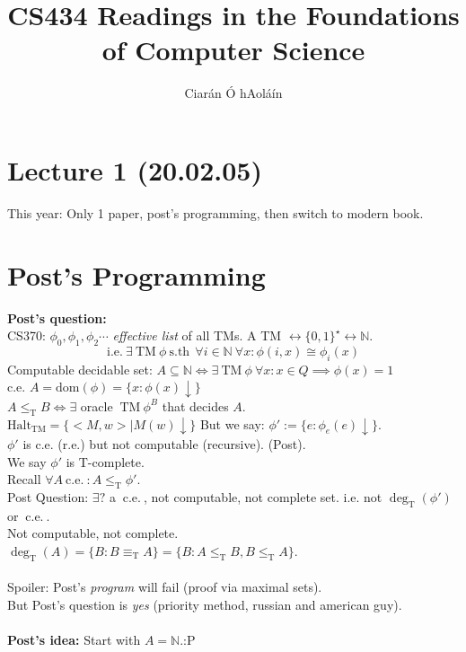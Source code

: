 \documentclass{article}
\title{CS434 Readings in the Foundations of Computer Science}
\author{Ciarán Ó hAoláín}
\let\ddd\cdots
\newcommand{\sth}{\ \mathrm{s.th}\ }
\newcommand{\N}{\mathbb{N}}
\newcommand{\tm}{\ \mathrm{TM}\ }
\newcommand{\sforall}{\ \forall}
\newcommand{\dom}{\mathrm{dom}}
\newcommand{\tr}{\leq_\mathrm{T}}
\newcommand{\halt}{\mathrm{Halt}_\mathrm{TM}}
\newcommand{\halts}{\downarrow}
\newcommand{\ce}{\ \mathrm{c.e.}\ }
\newcommand{\tdeg}{\deg_\mathrm{T}}
\newcommand{\teq}{\equiv_\mathrm{T}}
\theoremstyle{definition}
\theoremstyle{remark}
\theoremstyle{example}
\begin{document}
	\maketitle
	\section*{Lecture 1 (20.02.05)}
	This year: Only 1 paper, post's programming, then switch to modern book.
	\section{Post's Programming}
	\textbf{Post's question:}\\
	CS370: $\phi_0, \phi_1, \phi_2 \ddd$ \textit{effective list} of all TMs. A TM $\leftrightarrow \{0,1\}^\star \leftrightarrow \N$.\\
	\[\mathrm{i.e.\ }\exists \tm \phi \sth \sforall i \in \N \sforall x : \phi(i,x) \cong \phi_i(x) \]
	Computable decidable set: $A \subseteq \N \iff \exists \tm \phi \sforall x : x \in Q \implies \phi(x) = 1$\\
	c.e. $A = \dom(\phi) = \{x:\phi(x)\downarrow\}$\\
	$A \tr B \iff \exists$ oracle $\tm \phi^B$ that decides $A$.\\
	$\halt = \{ <M,w> \mid M(w) \halts \}$
	But we say: $\phi':=\{e:\phi_e(e)\halts\}$.\\
	$\phi'$ is c.e. (r.e.) but not computable (recursive). (Post).\\
	We say $\phi'$ is T-complete.\\
	Recall $\forall A \ce : A \tr \phi'$.\\
	Post Question: $\exists?$ a $\ce$, not computable, not complete set. i.e. not $\tdeg(\phi')$ or $\ce$.\\
	Not computable, not complete.\\
	$\tdeg (A) = \{B:B \teq A\} = \{B:A \tr B, B \tr A\}$.\\
	\\
	Spoiler: Post's \textit{program} will fail (proof via maximal sets).\\
	But Post's question is \textit{yes} (priority method, russian and american guy).\\
	\\
	\textbf{Post's idea:}
	Start with $A = \N$.:P 
	
\end{document}
